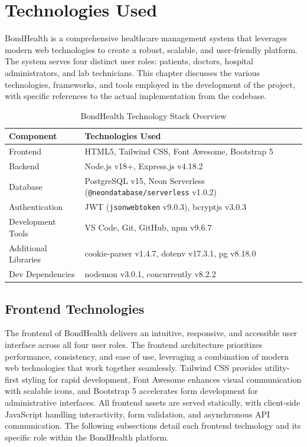\chapter{Technologies Used}

\justifying
\noindent BondHealth is a comprehensive healthcare management system that leverages modern web technologies to create a robust, scalable, and user-friendly platform. The system serves four distinct user roles: patients, doctors, hospital administrators, and lab technicians. This chapter discusses the various technologies, frameworks, and tools employed in the development of the project, with specific references to the actual implementation from the codebase.

\begin{table}[H]
\centering
\begin{tabular}{|l|p{10cm}|}
\hline
\textbf{Component} & \textbf{Technologies Used} \\
\hline
Frontend & HTML5, Tailwind CSS, Font Awesome, Bootstrap 5 \\
\hline
Backend & Node.js v18+, Express.js v4.18.2 \\
\hline
Database & PostgreSQL v15, Neon Serverless (\texttt{@neondatabase/serverless} v1.0.2) \\
\hline
Authentication & JWT (\texttt{jsonwebtoken} v9.0.3), bcryptjs v3.0.3 \\
\hline
Development Tools & VS Code, Git, GitHub, npm v9.6.7 \\
\hline
Additional Libraries & cookie-parser v1.4.7, dotenv v17.3.1, pg v8.18.0 \\
\hline
Dev Dependencies & nodemon v3.0.1, concurrently v8.2.2 \\
\hline
\end{tabular}
\caption{BondHealth Technology Stack Overview}
\label{tab:tech-stack}
\end{table}

\section{Frontend Technologies}
\justifying
\noindent The frontend of BondHealth delivers an intuitive, responsive, and accessible user interface across all four user roles. The frontend architecture prioritizes performance, consistency, and ease of use, leveraging a combination of modern web technologies that work together seamlessly. Tailwind CSS provides utility-first styling for rapid development, Font Awesome enhances visual communication with scalable icons, and Bootstrap 5 accelerates form development for administrative interfaces. All frontend assets are served statically, with client-side JavaScript handling interactivity, form validation, and asynchronous API communication. The following subsections detail each frontend technology and its specific role within the BondHealth platform.

